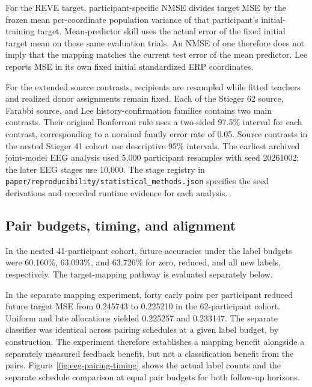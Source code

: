 \documentclass[11pt,a4paper]{article}
\begin{document}
For the REVE target, participant-specific NMSE divides target MSE by the frozen mean per-coordinate population variance of that participant's initial-training target. Mean-predictor skill uses the actual error of the fixed initial target mean on those same evaluation trials. An NMSE of one therefore does not imply that the mapping matches the current test error of the mean predictor. Lee reports MSE in its own fixed initial standardized ERP coordinates.

For the extended source contrasts, recipients are resampled while fitted teachers and realized donor assignments remain fixed. Each of the Stieger 62 source, Farabbi source, and Lee history-confirmation families contains two main contrasts. Their original Bonferroni rule uses a two-sided 97.5\% interval for each contrast, corresponding to a nominal family error rate of 0.05. Source contrasts in the nested Stieger 41 cohort use descriptive 95\% intervals. The earliest archived joint-model EEG analysis used 5,000 participant resamples with seed 20261002; the later EEG stages use 10,000. The stage registry in \texttt{paper/reproducibility/statistical\_methods.json} specifies the seed derivations and recorded runtime evidence for each analysis.

\subsection{Pair budgets, timing, and alignment}
\label{sec:paired}

In the nested 41-participant cohort, future accuracies under the label budgets were 60.160\%, 63.093\%, and 63.726\% for zero, reduced, and all new labels, respectively. The target-mapping pathway is evaluated separately below.

In the separate mapping experiment, forty early pairs per participant reduced future target MSE from 0.245743 to 0.225210 in the 62-participant cohort. Uniform and late allocations yielded 0.225257 and 0.233147. The separate classifier was identical across pairing schedules at a given label budget, by construction. The experiment therefore establishes a mapping benefit alongside a separately measured feedback benefit, but not a classification benefit from the pairs. Figure~\ref{fig:eeg-pairing-timing} shows the actual label counts and the separate schedule comparison at equal pair budgets for both follow-up horizons.
\end{document}
